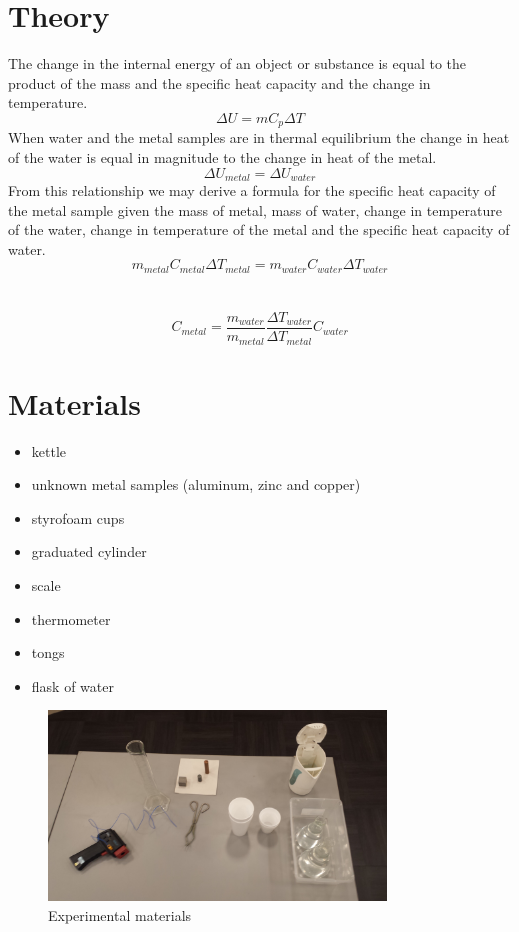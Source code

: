 \documentclass{article}
\begin{document}
\section{Theory}
The change in the internal energy of an object or substance is equal to the product of the mass and the specific heat capacity and the change in temperature.
$$\Delta U=mC_p\Delta T$$
When water and the metal samples are in thermal equilibrium the change in heat of the water is equal in magnitude to the change in heat of the metal.
$$\Delta U_{metal}=\Delta U_{water}$$
From this relationship we may derive a formula for the specific heat capacity of the metal sample given the mass of metal, mass of water, change in temperature of the water, change in temperature of the metal and the specific heat capacity of water.
$$m_{metal}C_{metal}\Delta T_{metal}=m_{water}C_{water}\Delta T_{water}$$\\
\\
$$\boxed{C_{metal}=\frac{m_{water}}{m_{metal}}  \frac{\Delta T_{water}}{\Delta T_{metal}}    C_{water}}$$

\newpage

\section{Materials}
\begin{itemize}
\item kettle 
\item unknown metal samples (aluminum, zinc and copper)
\item styrofoam cups
\item graduated cylinder
\item scale
\item thermometer
\item tongs
\item flask of water
\end{itemize}

\begin{figure}[h]
\begin{center}
\includegraphics[width=0.8\textwidth]{pic} %
\caption{Experimental materials}
\end{center}
\end{figure}
\end{document}
